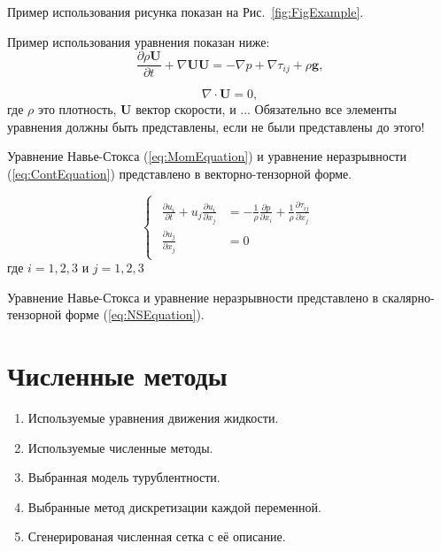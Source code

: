 \documentclass[11pt]{article}
\begin{document}
Пример использования рисунка показан на Рис.~\ref{fig:FigExample}.	

Пример использования уравнения показан ниже:
%
\begin{equation}
\frac{\partial \rho \mathbf{U}}{\partial t } + \nabla \mathbf{U} \mathbf{U} = -\nabla p + \nabla \tau_{ij} + \rho \mathbf{g},
\label{eq:MomEquation}
\end{equation}

\begin{equation}
\nabla \cdot \mathbf{U}=0,
\label{eq:ContEquation}
\end{equation}
%
где $\rho$ это плотность, $\mathbf{U}$ вектор скорости, и ... Обязательно все элементы уравнения должны быть представлены, если не были представлены до этого! 

Уравнение Навье-Стокса (\ref{eq:MomEquation}) и уравнение неразрывности (\ref{eq:ContEquation}) представлено в векторно-тензорной форме.

\begin{equation}
\begin{cases}
	\begin{aligned}
		\frac{\partial u_{i}}{\partial t}+u_{j}\frac{\partial u_{i}}{\partial x_{j}} &=-\frac{1}{\rho}\frac{\partial p}{\partial x_{i}}+\frac{1}{\rho}\frac{\partial \tau_{ij}}{\partial x_{j}}\\
		\frac{\partial u_{j}}{\partial x_{j}} &=0
	\end{aligned}
\end{cases}
\label{eq:NSEquation}
\end{equation}
где $i=1,2,3$ и $j=1,2,3$

Уравнение Навье-Стокса и уравнение неразрывности представлено в скалярно-тензорной форме (\ref{eq:NSEquation}).

\section{Численные методы}\label{sec:NumMethod}

\begin{enumerate}
	\item Используемые уравнения движения жидкости.
	\item Используемые численные методы.
	\item Выбранная модель турублентности.
	\item Выбранные метод дискретизации каждой переменной.
	\item Сгенерированая численная сетка с её описание.
\end{enumerate}
\end{document}
